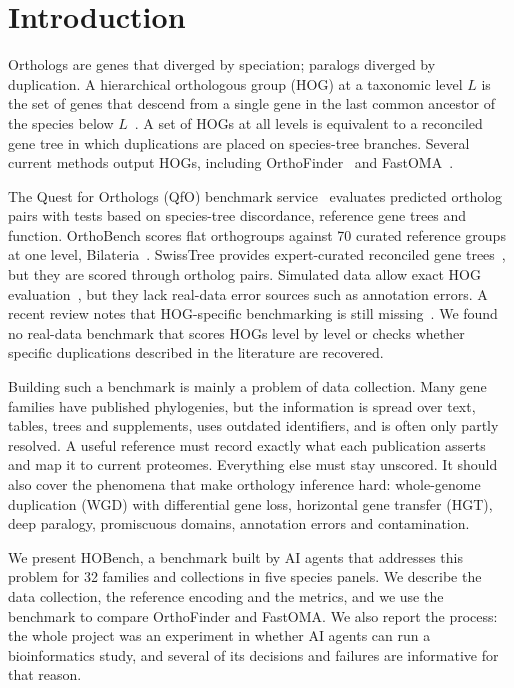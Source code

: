 \linenumbers

\section*{Introduction}
Orthologs are genes that diverged by speciation; paralogs diverged by duplication. A hierarchical orthologous group
(HOG) at a taxonomic level $L$ is the set of genes that descend from a single gene in the last common ancestor of the
species below $L$~\cite{altenhoff2013hogs,train2017gethogs}. A set of HOGs at all levels is equivalent to a reconciled
gene tree in which duplications are placed on species-tree branches. Several current methods output HOGs, including
OrthoFinder~\cite{emms2019orthofinder,emms2026orthofinder3} and FastOMA~\cite{majidian2025fastoma}.

The Quest for Orthologs (QfO) benchmark service~\cite{altenhoff2016qfo,nevers2022qfo} evaluates predicted ortholog
pairs with tests based on species-tree discordance, reference gene trees and function. OrthoBench scores flat
orthogroups against 70 curated reference groups at one level, Bilateria~\cite{trachana2011orthobench,emms2020orthobench}.
SwissTree provides expert-curated reconciled gene trees~\cite{boeckmann2011swisstree}, but they are scored through
ortholog pairs. Simulated data allow exact HOG evaluation~\cite{altenhoff2013hogs,dalquen2012alf}, but they lack
real-data error sources such as annotation errors. A recent review notes that HOG-specific benchmarking is still
missing~\cite{sartonloheac2025hogs}. We found no real-data benchmark that scores HOGs level by level or checks
whether specific duplications described in the literature are recovered.

Building such a benchmark is mainly a problem of data collection. Many gene families have published phylogenies, but the
information is spread over text, tables, trees and supplements, uses outdated identifiers, and is often only partly
resolved. A useful reference must record exactly what each publication asserts and map it to current proteomes. Everything
else must stay unscored. It should also cover the phenomena that make orthology inference hard: whole-genome duplication
(WGD) with differential gene loss, horizontal gene transfer (HGT), deep paralogy, promiscuous domains, annotation
errors and contamination.

We present HOBench, a benchmark built by AI agents that addresses this problem for 32 families and collections in
five species panels. We describe the data collection, the reference encoding and the metrics, and we use the
benchmark to compare OrthoFinder and FastOMA. We also report the process: the whole project was an experiment in
whether AI agents can run a bioinformatics study, and several of its decisions and failures are informative for that
reason.

